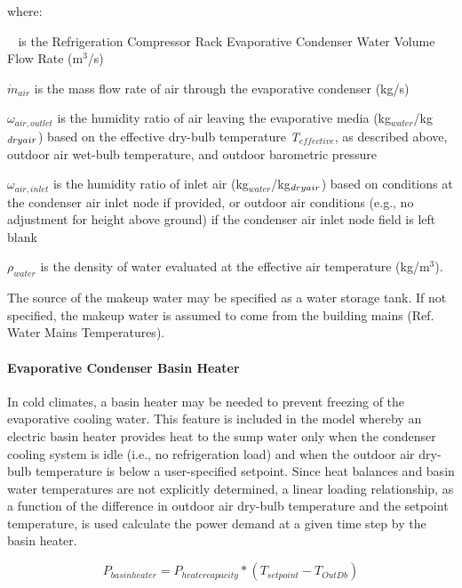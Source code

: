where:

\(\mathop {{{\dot V}_{evaporation,makeup}}}\limits^{}\) is the Refrigeration Compressor Rack Evaporative Condenser Water Volume Flow Rate (m\(^{3}\)/s)

\(\dot m_{air}\)  is the mass flow rate of air through the evaporative condenser (kg/s)

\({\omega_{air,outlet}}\) is the humidity ratio of air leaving the evaporative media (kg\(_{water}\)/kg\(_{dry\\ air}\)) based on the effective dry-bulb temperature \emph{T\(_{effective}\)}, as described above, outdoor air wet-bulb temperature, and outdoor barometric pressure

\({\omega_{air,inlet}}\) is the humidity ratio of inlet air (kg\(_{water}\)/kg\(_{dry\\ air}\)) based on conditions at the condenser air inlet node if provided, or outdoor air conditions (e.g., no adjustment for height above ground) if the condenser air inlet node field is left blank

\({\rho_{water}}\) is the density of water evaluated at the effective air temperature (kg/m\(^{3}\)).

The source of the makeup water may be specified as a water storage tank. If not specified, the makeup water is assumed to come from the building mains (Ref. Water Mains Temperatures).

\paragraph{Evaporative Condenser Basin Heater}\label{evaporative-condenser-basin-heater}

In cold climates, a basin heater may be needed to prevent freezing of the evaporative cooling water. This feature is included in the model whereby an electric basin heater provides heat to the sump water only when the condenser cooling system is idle (i.e., no refrigeration load) and when the outdoor air dry-bulb temperature is below a user-specified setpoint. Since heat balances and basin water temperatures are not explicitly determined, a linear loading relationship, as a function of the difference in outdoor air dry-bulb temperature and the setpoint temperature, is used calculate the power demand at a given time step by the basin heater.

\begin{equation}
{P_{basinheater}} = {P_{heatercapacity}}*({T_{setpoint}} - {T_{OutDb}})
\end{equation}

